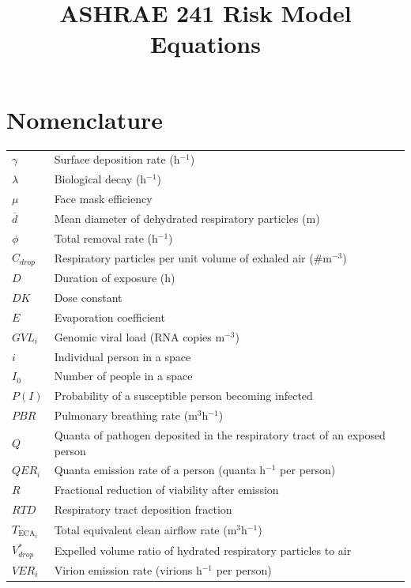 \documentclass[12pt]{article}
\title{ASHRAE 241 Risk Model Equations}
\author{}
\date{}
\begin{document}
\maketitle

\section*{Nomenclature}

\begin{tabular}{ll}
$\gamma$         & Surface deposition rate (h$^{-1}$) \\
$\lambda$        & Biological decay (h$^{-1}$) \\
$\mu$            & Face mask efficiency \\
$\overline{d}$   & Mean diameter of dehydrated respiratory particles (m) \\
$\phi$           & Total removal rate (h$^{-1}$) \\
$C_{drop}$       & Respiratory particles per unit volume of exhaled air (\#m$^{-3}$) \\
$D$              & Duration of exposure (h) \\
$DK$             & Dose constant \\
$E$              & Evaporation coefficient \\
$GVL_i$          & Genomic viral load (RNA copies m$^{-3}$) \\
$i$              & Individual person in a space \\
$I_0$            & Number of people in a space \\
$P(I)$           & Probability of a susceptible person becoming infected \\
$PBR$            & Pulmonary breathing rate (m$^3$h$^{-1}$) \\
$Q$              & Quanta of pathogen deposited in the respiratory tract of an exposed person \\
$QER_i$          & Quanta emission rate of a person (quanta h$^{-1}$ per person) \\
$R$              & Fractional reduction of viability after emission \\
$RTD$            & Respiratory tract deposition fraction \\
$T_{\text{ECA}_i}$ & Total equivalent clean airflow rate (m$^3$h$^{-1}$) \\
$V^{*}_{drop}$   & Expelled volume ratio of hydrated respiratory particles to air \\
$VER_i$          & Virion emission rate (virions h$^{-1}$ per person) \\

\end{tabular}
\end{document}
